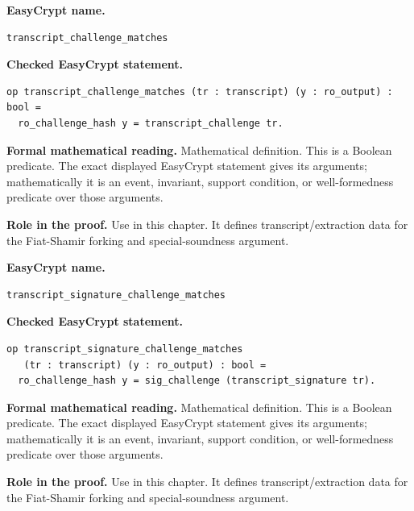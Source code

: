 \begin{formaldefinition}
\noindent\textbf{EasyCrypt name.}
\begin{lstlisting}[language=EasyCrypt,basicstyle=\ttfamily\scriptsize]
transcript_challenge_matches
\end{lstlisting}
\noindent\textbf{Checked EasyCrypt statement.}
\begin{lstlisting}[language=EasyCrypt,basicstyle=\ttfamily\scriptsize]
op transcript_challenge_matches (tr : transcript) (y : ro_output) : bool =
  ro_challenge_hash y = transcript_challenge tr.
\end{lstlisting}
\noindent\textbf{Formal mathematical reading.}
Mathematical definition. This is a Boolean predicate.  The exact displayed EasyCrypt statement gives its arguments; mathematically it is an event, invariant, support condition, or well-formedness predicate over those arguments.

\noindent\textbf{Role in the proof.}
Use in this chapter. It defines transcript/extraction data for the Fiat-Shamir forking and special-soundness argument.

\end{formaldefinition}

\begin{formaldefinition}
\noindent\textbf{EasyCrypt name.}
\begin{lstlisting}[language=EasyCrypt,basicstyle=\ttfamily\scriptsize]
transcript_signature_challenge_matches
\end{lstlisting}
\noindent\textbf{Checked EasyCrypt statement.}
\begin{lstlisting}[language=EasyCrypt,basicstyle=\ttfamily\scriptsize]
op transcript_signature_challenge_matches
   (tr : transcript) (y : ro_output) : bool =
  ro_challenge_hash y = sig_challenge (transcript_signature tr).
\end{lstlisting}
\noindent\textbf{Formal mathematical reading.}
Mathematical definition. This is a Boolean predicate.  The exact displayed EasyCrypt statement gives its arguments; mathematically it is an event, invariant, support condition, or well-formedness predicate over those arguments.

\noindent\textbf{Role in the proof.}
Use in this chapter. It defines transcript/extraction data for the Fiat-Shamir forking and special-soundness argument.

\end{formaldefinition}

